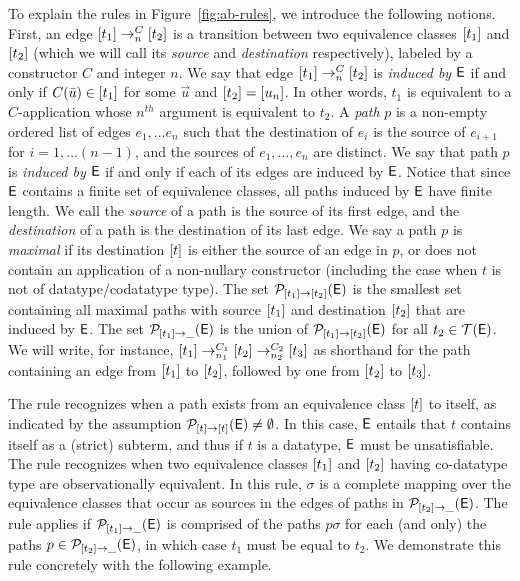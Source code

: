 To explain the rules in Figure~\ref{fig:ab-rules}, we introduce the following notions.
First, an edge $[ t_1 ] \rightarrow^{C}_n [ t_2 ]$ is a transition between two equivalence classes $[ t_1 ]$ and $[ t_2 ]$ 
(which we will call its \emph{source} and \emph{destination} respectively),
labeled by a constructor $C$ and integer $n$.
We say that edge $[ t_1 ] \rightarrow^{C}_n [ t_2 ]$ is \emph{induced by $\mathsf{E}$} if and only if $C( \bar u ) \in [ t_1 ]$ for some $\vec u$ and $[ t_2 ] = [ u_n ]$.
In other words, $t_1$ is equivalent to a $C$-application whose $n^{th}$ argument is equivalent to $t_2$.
A \emph{path} $p$ is a non-empty ordered list of edges $e_1, \ldots e_n$ such that the destination of $e_i$ is the source of $e_{i+1}$ for $i = 1, \ldots (n-1)$,
and the sources of $e_1, \ldots, e_n$ are distinct.
We say that path $p$ is \emph{induced by $\mathsf{E}$} if and only if each of its edges are induced by $\mathsf{E}$.
Notice that since $\mathsf{E}$ contains a finite set of equivalence classes, all paths induced by $\mathsf{E}$ have finite length.
We call the \emph{source} of a path is the source of its first edge, and the \emph{destination} of a path is the destination of its last edge.
We say a path $p$ is \emph{maximal} if its destination $[ t ]$ is either
the source of an edge in $p$, 
or does not contain an application of a non-nullary constructor (including the case when $t$ is not of datatype/codatatype type).
The set $\mathcal{P}_{ [ t_1 ] \rightarrow [ t_2 ] }( \mathsf{E} )$ is the smallest set containing all maximal paths with source $[ t_1 ]$ and destination $[ t_2 ]$ that are induced by $\mathsf{E}$.
The set $\mathcal{P}_{ [ t_1 ] \rightarrow \_ }( \mathsf{E} )$ is the union of $\mathcal{P}_{ [ t_1 ] \rightarrow [ t_2 ] }( \mathsf{E} )$ for all $t_2 \in \mathcal{T}(\mathsf{E})$.
We will write, for instance, $[ t_1 ] \rightarrow^{C_1}_{n_1} [ t_2 ] \rightarrow^{C_2}_{n_2} [ t_3 ]$ 
as shorthand for the path containing an edge from $[ t_1 ]$ to $[ t_2 ]$, followed by one from $[ t_2 ]$ to $[ t_3 ]$.

The rule  recognizes when a path exists from an equivalence class $[ t ]$ to itself, as indicated
by the assumption $\mathcal{P}_{ [ t ] \rightarrow [ t ] }( \mathsf{E} ) \neq \emptyset$.
In this case, $\mathsf{E}$ entails that $t$ contains itself as a (strict) subterm,
and thus if $t$ is a datatype, $\mathsf{E}$ must be unsatisfiable.
The rule  recognizes when two equivalence classes $[ t_1 ]$ and $[ t_2 ]$ having co-datatype type are observationally equivalent.
In this rule, $\sigma$ is a complete mapping over the equivalence classes that occur as sources in the edges of paths in $\mathcal{P}_{ [ t_2 ] \rightarrow \_ }( \mathsf{E} )$.
The rule applies if $\mathcal{P}_{ [ t_1 ] \rightarrow \_ }( \mathsf{E} )$ is comprised of the paths $p \sigma$ for each (and only) the paths $p \in \mathcal{P}_{ [ t_2 ] \rightarrow \_ }( \mathsf{E} )$,
in which case $t_1$ must be equal to $t_2$.
We demonstrate this rule concretely with the following example.

